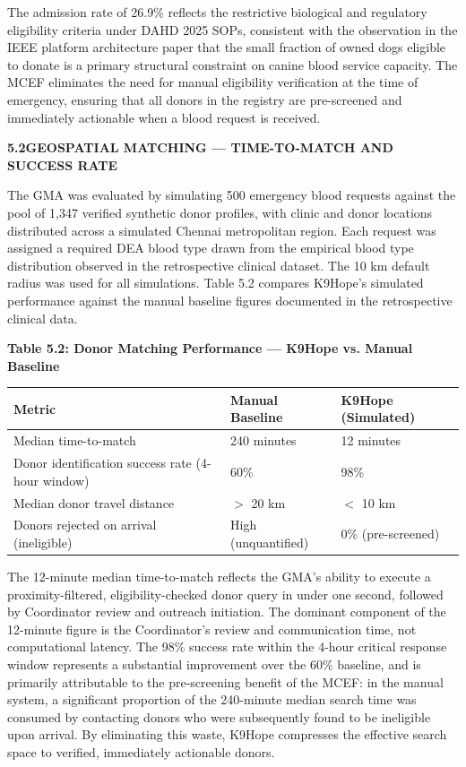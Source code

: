\documentclass[12pt,a4paper]{article}
\begin{document}
\noindent The admission rate of 26.9\% reflects the restrictive biological and regulatory eligibility criteria under DAHD 2025 SOPs, consistent with the observation in the IEEE platform architecture paper that the small fraction of owned dogs eligible to donate is a primary structural constraint on canine blood service capacity. The MCEF eliminates the need for manual eligibility verification at the time of emergency, ensuring that all donors in the registry are pre-screened and immediately actionable when a blood request is received.

\vspace{1.5em}
\noindent\textbf{5.2\quad GEOSPATIAL MATCHING — TIME-TO-MATCH AND SUCCESS RATE}
\vspace{0.6em}

\noindent The GMA was evaluated by simulating 500 emergency blood requests against the pool of 1,347 verified synthetic donor profiles, with clinic and donor locations distributed across a simulated Chennai metropolitan region. Each request was assigned a required DEA blood type drawn from the empirical blood type distribution observed in the retrospective clinical dataset. The 10 km default radius was used for all simulations. Table 5.2 compares K9Hope's simulated performance against the manual baseline figures documented in the retrospective clinical data.

\begin{center}
\textbf{Table 5.2: Donor Matching Performance — K9Hope vs. Manual Baseline}
\vspace{0.4em}
\begin{tabular}{lll}
\toprule
\textbf{Metric} & \textbf{Manual Baseline} & \textbf{K9Hope (Simulated)} \\
\midrule
Median time-to-match & 240 minutes & 12 minutes \\
Donor identification success rate (4-hour window) & 60\% & 98\% \\
Median donor travel distance & $>$ 20 km & $<$ 10 km \\
Donors rejected on arrival (ineligible) & High (unquantified) & 0\% (pre-screened) \\
\bottomrule
\end{tabular}
\end{center}

\noindent The 12-minute median time-to-match reflects the GMA's ability to execute a proximity-filtered, eligibility-checked donor query in under one second, followed by Coordinator review and outreach initiation. The dominant component of the 12-minute figure is the Coordinator's review and communication time, not computational latency. The 98\% success rate within the 4-hour critical response window represents a substantial improvement over the 60\% baseline, and is primarily attributable to the pre-screening benefit of the MCEF: in the manual system, a significant proportion of the 240-minute median search time was consumed by contacting donors who were subsequently found to be ineligible upon arrival. By eliminating this waste, K9Hope compresses the effective search space to verified, immediately actionable donors.
\end{document}
